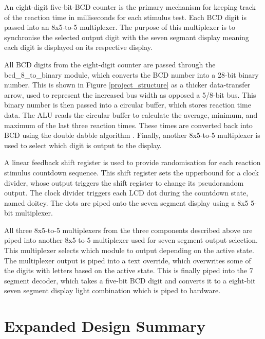 \documentclass[11pt]{article}
\begin{document}
An eight-digit five-bit-BCD counter is the primary mechanism for keeping track of the reaction time in milliseconds for each stimulus test. Each BCD digit is passed into an 8x5-to-5 multiplexer. The purpose of this multiplexer is to synchronise the selected output digit with the seven segmant display meaning each digit is displayed on its respective display.

All BCD digits from the eight-digit counter are passed through the bcd\_8\_to\_binary module, which converts the BCD number into a 28-bit binary number. This is shown in Figure \ref{project_structure} as a thicker data-transfer arrow, used to represent the increased bus width as opposed a 5/8-bit bus. This binary number is then passed into a circular buffer, which stores reaction time data. The ALU reads the circular buffer to calculate the average, minimum, and maximum of the last three reaction times. These times are converted back into BCD using the double dabble algorithm \cite{double_dabble}. Finally, another 8x5-to-5 multiplexer is used to select which digit is output to the display.

A linear feedback shift register is used to provide randomisation for each reaction stimulus countdown sequence. This shift register sets the upperbound for a clock divider, whose output triggers the shift register to change its pseudorandom output. The clock divider triggers each LCD dot during the countdown state, named doitey. The dots are piped onto the seven segment display using a 8x5 5-bit multiplexer.

All three 8x5-to-5 multiplexers from the three components described above are piped into another 8x5-to-5 multiplexer used for seven segment output selection. This multiplexer selects which module to output depending on the active state. The multiplexer output is piped into a text override, which overwrites some of the digits with letters based on the active state. This is finally piped into the 7 segment decoder, which takes a five-bit BCD digit and converts it to a eight-bit seven segment display light combination which is piped to hardware.

\section{Expanded Design Summary}
\end{document}
